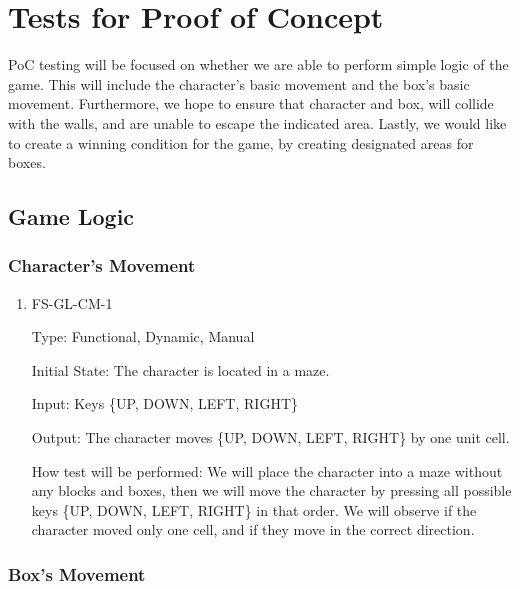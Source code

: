 \documentclass[12pt, titlepage]{article}
\begin{document}
\section{Tests for Proof of Concept}

PoC testing will be focused on whether we are able to perform simple logic of the game. This will include the character's basic movement and the box's basic movement. Furthermore, we hope to ensure that character and box, will collide with the walls, and are unable to escape the indicated area. Lastly, we would like to create a winning condition for the game, by creating designated areas for boxes.

\subsection{Game Logic}
		
\subsubsection{Character's Movement}

\begin{enumerate}

\item{FS-GL-CM-1\\}

Type: Functional, Dynamic, Manual
					
Initial State: The character is located in a maze.
					
Input: Keys \{UP, DOWN, LEFT, RIGHT\}
					
Output: The character moves \{UP, DOWN, LEFT, RIGHT\} by one unit cell.
					
How test will be performed: We will place the character into a maze without any blocks and boxes, then we will move the character by pressing all possible keys \{UP, DOWN, LEFT, RIGHT\} in that order. We will observe if the character moved only one cell, and if they move in the correct direction.

\end{enumerate}

\subsubsection{Box's Movement}
\end{document}
